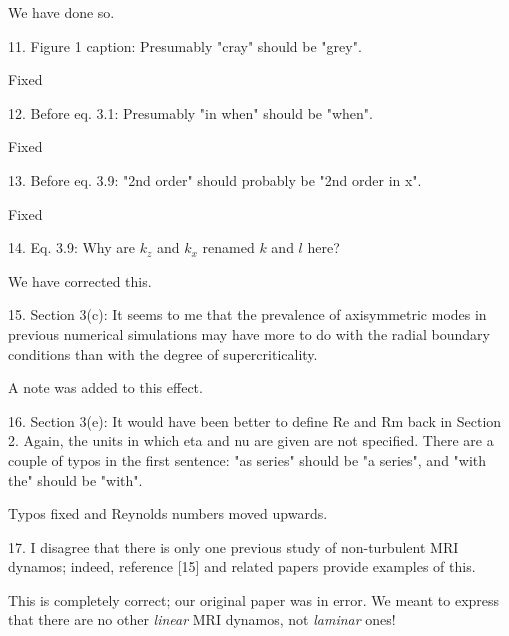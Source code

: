 \documentclass[letterpaper, 12pt]{article}
\newenvironment{review}{\vspace{1em}\begin{leftbar}}{\end{leftbar}}
\begin{document}
We have done so.

\begin{review}
11. Figure 1 caption: Presumably "cray" should be "grey".  
\end{review}


Fixed

\begin{review}
12. Before eq. 3.1: Presumably "in when" should be "when".  
\end{review}

Fixed


\begin{review}
13. Before eq. 3.9: "2nd order" should probably be "2nd order in x".  
\end{review}

Fixed


\begin{review}
14. Eq. 3.9: Why are $k_z$ and $k_x$ renamed $k$ and $l$ here?  
\end{review}

We have corrected this.


\begin{review}
15. Section 3(c): It seems to me that the prevalence of axisymmetric modes in previous numerical simulations may have more to do with the radial boundary conditions than with the degree of supercriticality.
\end{review}

A note was added to this effect.


\begin{review}
16. Section 3(e): It would have been better to define Re and Rm back in Section 2. Again, the units in which eta and nu are given are not specified. There are a couple of typos in the first sentence: "as series" should be "a series", and "with the" should be "with".
\end{review}

Typos fixed and Reynolds numbers moved upwards.


\begin{review}
17. I disagree that there is only one previous study of non-turbulent MRI dynamos; indeed, reference [15] and related papers provide examples of this.  
\end{review}

This is completely correct; our original paper was in error. We meant to express that there are no other \emph{linear} MRI dynamos, not \emph{laminar} ones!
\end{document}
